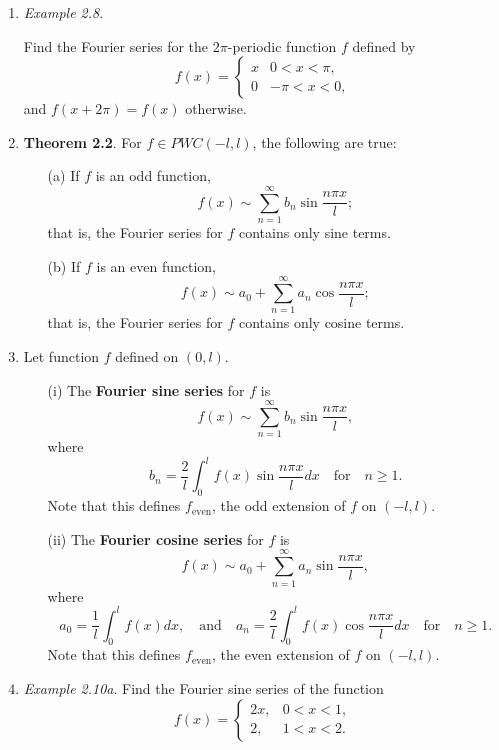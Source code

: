 \begin{enumerate}
\item \textit{Example 2.8}.

Find the Fourier series for the $2\pi$-periodic function $f$ defined by
\[f(x)=
\begin{cases}
x & 0<x<\pi ,\\
0 & -\pi<x<0,
\end{cases}
\]
and $f(x+2\pi)=f(x)$ otherwise.





\newpage



\item \textbf{Theorem 2.2}. For $f \in P W C(-l, l)$, the following are true:

\begin{itemize}
    \item[(a)] If $f$ is an odd function,
    \[f(x) \sim \sum_{n=1}^{\infty}b_{n}\sin\frac{n\pi x}{l};\]
that is, the Fourier series for $f$ contains only sine terms.
    \item[(b)] If $f$ is an even function,
    \[f(x) \sim a_{0} + \sum_{n=1}^{\infty}a_{n}\cos\frac{n\pi x}{l};\]
that is, the Fourier series for $f$ contains only cosine terms.
\end{itemize}



\item Let function $f$ defined on $(0,l)$.
\begin{itemize}
    \item[(i)] The \textbf{Fourier sine series} for $f$ is
    \[f(x) \sim \sum_{n=1}^{\infty}b_{n}\sin\frac{n\pi x}{l},\]
    where
    \[b_{n} = \frac{2}{l}\int_{0}^{l}f(x)\sin\frac{n\pi x}{l}dx \quad \text{for} \quad n \geq 1. \]
    Note that this defines $f_{\text{even}}$, the  odd extension of $f$ on $(-l,l)$.
    \item[(ii)] The \textbf{Fourier cosine series} for $f$ is
    \[f(x) \sim a_{0} + \sum_{n=1}^{\infty}a_{n}\sin\frac{n\pi x}{l},\]
    where
    \[a_{0} = \frac{1}{l}\int_{0}^{l}f(x)dx, \quad \text{and} \quad a_{n} = \frac{2}{l}\int_{0}^{l}f(x)\cos\frac{n\pi x}{l}dx\quad \text{for} \quad n \geq 1. \]
    Note that this defines $f_{\text{even}}$, the even extension of $f$ on $(-l,l)$.
\end{itemize}

\newpage

\item \textit{Example 2.10a}. Find the Fourier sine series of the function
\[
f(x)=
\begin{cases}
    2x, & 0<x<1, \\
    2, & 1<x<2.
\end{cases}
\]



\end{enumerate}
